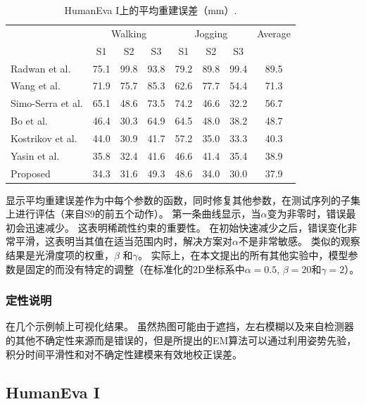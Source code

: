\begin{table}
\caption{HumanEva I上的平均重建误差（mm）\cite{sigal2010humaneva}.}
\centering
\renewcommand{\arraystretch}{1.5}
\begin{tabular}{l*{3}{c}*{4}{c}}
\toprule
& \multicolumn{3}{c}{Walking} & \multicolumn{3}{c}{Jogging} & Average \\
& S1 & S2 & S3 & S1 & S2 & S3 \\
\toprule
Radwan et al. \cite{radwan2013monocular} & 75.1 & 99.8 & 93.8 & 79.2 & 89.8 & 99.4 & 89.5 \\
Wang et al. \cite{wang2014robust} & 71.9 & 75.7 & 85.3 & 62.6 & 77.7 & 54.4 & 71.3 \\
Simo-Serra et al. \cite{simo2013joint} & 65.1 & 48.6 & 73.5 & 74.2 & 46.6 & 32.2 & 56.7\\
Bo et al. \cite{bo2010twin} & 46.4 & {30.3} & 64.9 & 64.5 & 48.0 & 38.2 & 48.7 \\
Kostrikov et al. \cite{kostrikov2014depth} & 44.0 & 30.9 & 41.7 & 57.2 & 35.0 & 33.3 & 40.3 \\
Yasin et al. \cite{yasin2016dual} & 35.8 & 32.4 & {41.6} & {46.6} & 41.4 & 35.4 & 38.9 \\
Proposed & {34.3} & 31.6 & 49.3 & 48.6 & {34.0} & {30.0} & {37.9}\\
\toprule
\end{tabular}
\label{tab:humaneva}
\end{table}

显示平均重建误差作为中每个参数的函数，同时修复其他参数，在测试序列的子集上进行评估（来自S9的前五个动作）。 第一条曲线显示，当$\alpha$变为非零时，错误最初会迅速减少。 这表明稀疏性约束的重要性。 在初始快速减少之后，错误变化非常平滑，这表明当其值在适当范围内时，解决方案对$\alpha$不是非常敏感。 类似的观察结果是光滑度项的权重，$\beta$ 和$\gamma$。
实际上，在本文提出的所有其他实验中，模型参数是固定的而没有特定的调整（在标准化的2D坐标系中$\alpha=0.5$, $\beta=20$和$\gamma=2$）。

\subsubsection{定性说明}

在几个示例帧上可视化结果。 虽然热图可能由于遮挡，左右模糊以及来自检测器的其他不确定性来源而是错误的，但是所提出的EM算法可以通过利用姿势先验，积分时间平滑性和对不确定性建模来有效地校正误差。

\subsection{HumanEva I}


